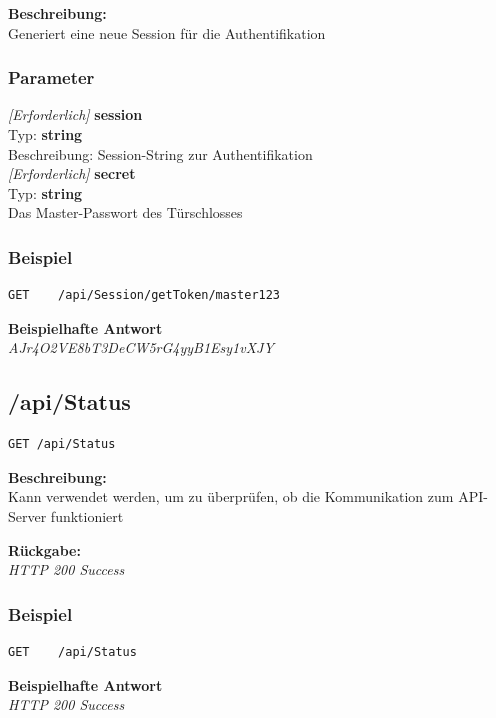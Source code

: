\textbf{Beschreibung:} \\
Generiert eine neue Session für die Authentifikation

\subsubsection{Parameter}
\textit{[Erforderlich]} \textbf{session} \\
Typ: \textbf{string} \\
Beschreibung: Session-String zur Authentifikation\\

\textit{[Erforderlich]} \textbf{secret} \\
Typ: \textbf{string} \\
Das Master-Passwort des Türschlosses

\subsubsection{Beispiel}
\begin{lstlisting}
GET    /api/Session/getToken/master123
\end{lstlisting}

\textbf{Beispielhafte Antwort} \\
\textit{AJr4O2VE8bT3DeCW5rG4yyB1Esy1vXJY}





\subsection{/api/Status}
\begin{lstlisting}
GET /api/Status
\end{lstlisting}

\textbf{Beschreibung:} \\
Kann verwendet werden, um zu überprüfen, ob die Kommunikation zum API-Server funktioniert

\textbf{Rückgabe:} \\
\textit{HTTP 200 Success}

\subsubsection{Beispiel}
\begin{lstlisting}
GET    /api/Status
\end{lstlisting}

\textbf{Beispielhafte Antwort} \\
\textit{HTTP 200 Success}